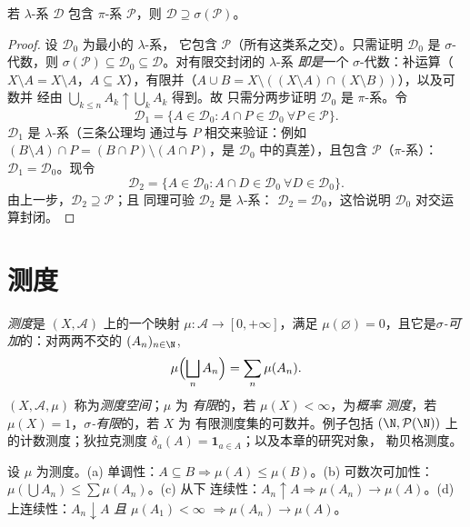 \begin{theorem}[戴金 $\pi$--$\lambda$ 引理]
\label{thm:b3:measure:dynkin}
若 $\lambda$-系 $\mathcal D$ 包含 $\pi$-系
$\mathcal P$，则 $\mathcal D \supseteq
\sigma(\mathcal P)$。
\end{theorem}

\begin{proof}
设 $\mathcal D_0$ 为最小的 $\lambda$-系，
它包含 $\mathcal P$（所有这类系之交）。只需证明
$\mathcal D_0$ 是 $\sigma$-代数，则
$\sigma(\mathcal P) \subseteq \mathcal D_0 \subseteq \mathcal
D$。对有限交封闭的 $\lambda$-系
\emph{即是}一个 $\sigma$-代数：补运算（$X \setminus A = X
\setminus A$，$A \subseteq X$），有限并（$A \cup B =
X \setminus ((X\setminus A)\cap(X\setminus B))$），以及可数并
经由 $\bigcup_{k \leq n}A_k \uparrow \bigcup_kA_k$ 得到。故
只需分两步证明 $\mathcal D_0$ 是 $\pi$-系。令
\[
\mathcal D_1 = \{A \in \mathcal D_0 : A \cap P \in \mathcal
D_0 \ \forall P \in \mathcal P\}.
\]
$\mathcal D_1$ 是 $\lambda$-系（三条公理均
通过与 $P$ 相交来验证：例如 $(B\setminus A)\cap P
= (B \cap P)\setminus(A \cap P)$，是
$\mathcal D_0$ 中的真差），且包含 $\mathcal P$（$\pi$-系）：
$\mathcal D_1 = \mathcal D_0$。现令
\[
\mathcal D_2 = \{A \in \mathcal D_0 : A \cap D \in \mathcal
D_0\ \forall D \in \mathcal D_0\}.
\]
由上一步，$\mathcal D_2 \supseteq \mathcal P$；且
同理可验 $\mathcal D_2$ 是 $\lambda$-系：
$\mathcal D_2 = \mathcal D_0$，这恰说明
$\mathcal D_0$ 对交运算封闭。
\end{proof}

\section{测度}

\begin{definition}\label{def:b3:measure:measure}
\emph{测度}是 $(X, \mathcal A)$ 上的一个映射
$\mu \colon \mathcal A \to [0, +\infty]$，满足 $\mu(\varnothing)
= 0$，且它是\emph{$\sigma$-可加}的：对两两不交的
$(A_n)_{n\in\N}$,
\[
\mu\Bigl(\bigsqcup_n A_n\Bigr) = \sum_n \mu(A_n).
\]
$(X, \mathcal A, \mu)$ 称为\emph{测度空间}；$\mu$ 为
\emph{有限}的，若 $\mu(X) < \infty$，为\emph{概率
测度}，若 $\mu(X) = 1$，\emph{$\sigma$-有限}的，若 $X$ 为
有限测度集的可数并。例子包括
$(\N, \mathcal P(\N))$ 上的计数测度；狄拉克测度 $\delta_a(A)
= \mathbf 1_{a \in A}$；以及本章的研究对象，
勒贝格测度。
\end{definition}

\begin{proposition}\label{prop:b3:measure:basics}
设 $\mu$ 为测度。(a) 单调性：$A \subseteq B
\Rightarrow \mu(A) \leq \mu(B)$。(b) 可数次可加性：
$\mu(\bigcup A_n) \leq \sum\mu(A_n)$。(c) 从下
连续性：$A_n \uparrow A \Rightarrow \mu(A_n) \to \mu(A)$。(d)
上连续性：$A_n \downarrow A$ \emph{且
$\mu(A_1) < \infty$} $\Rightarrow \mu(A_n) \to \mu(A)$。
\end{proposition}

